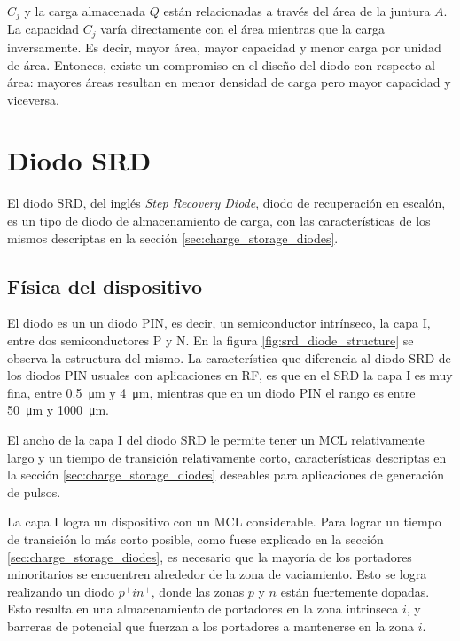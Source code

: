 $C_j$ y la carga almacenada $Q$ están relacionadas a través del área de la
juntura $A$. La capacidad $C_j$ varía directamente con el área mientras que la
carga inversamente. Es decir, mayor área, mayor capacidad y menor carga por
unidad de área. Entonces, existe un compromiso en el diseño del diodo con
respecto al área: mayores áreas resultan en menor densidad de carga pero mayor
capacidad y viceversa. \cite{moll1962}

\section{Diodo SRD}
\label{sec:srd_diode}

El diodo SRD, del inglés \textit{Step Recovery Diode}, diodo de recuperación en
escalón, es un tipo de diodo de almacenamiento de carga, con las características
de los mismos descriptas en la sección \ref{sec:charge_storage_diodes}.

\subsection{Física del dispositivo}

El diodo es un un diodo PIN, es decir, un semiconductor intrínseco, la capa I,
entre dos semiconductores P y N. En la figura \ref{fig:srd_diode_structure} se
observa la estructura del mismo. La característica que diferencia al diodo SRD
de los diodos PIN usuales con aplicaciones en RF, es que en el SRD la capa I es
muy fina, entre \qty{0.5}{\micro\meter} y \qty{4}{\micro\meter}, mientras que en
un diodo PIN el rango es entre \qty{50}{\micro\meter} y
\qty{1000}{\micro\meter}.

El ancho de la capa I del diodo SRD le permite tener un MCL relativamente largo
y un tiempo de transición relativamente corto, características descriptas en
la sección \ref{sec:charge_storage_diodes} deseables para aplicaciones de generación de pulsos.

La capa I logra un dispositivo con un MCL considerable. Para lograr un tiempo de
transición lo más corto posible, como fuese explicado en la sección
\ref{sec:charge_storage_diodes}, es necesario que la mayoría de los portadores
minoritarios se encuentren alrededor de la zona de vaciamiento. Esto se logra
realizando un diodo $p^+in^+$, donde las zonas $p$ y $n$ están fuertemente
dopadas. Esto resulta en una almacenamiento de portadores en la zona intrinseca
$i$, y barreras de potencial que fuerzan a los portadores a mantenerse en la
zona $i$.

